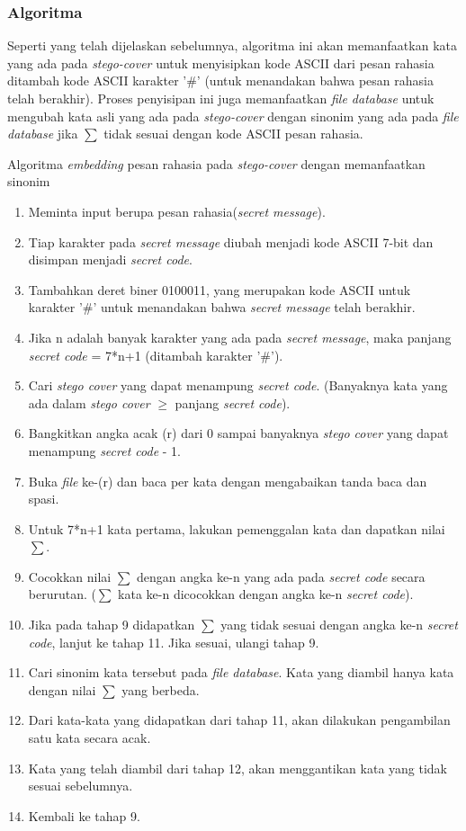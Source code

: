 \subsubsection{Algoritma}
Seperti yang telah dijelaskan sebelumnya, algoritma ini akan memanfaatkan kata yang ada pada \textit{stego-cover} untuk menyisipkan kode ASCII dari pesan rahasia ditambah kode ASCII karakter '\#' (untuk menandakan bahwa pesan rahasia telah berakhir). Proses penyisipan ini juga memanfaatkan \textit{file database} untuk mengubah kata asli yang ada pada \textit{stego-cover} dengan sinonim yang ada pada \textit{file database} jika $\sum$ tidak sesuai dengan kode ASCII pesan rahasia.

Algoritma \textit{embedding} pesan rahasia pada \textit{stego-cover} dengan memanfaatkan sinonim

\begin{enumerate}
	\item Meminta input berupa pesan rahasia(\textit{secret message}).
	\item Tiap karakter pada \textit{secret message} diubah menjadi kode ASCII 7-bit dan disimpan menjadi \textit{secret code}.
	\item Tambahkan deret biner 0100011, yang merupakan kode ASCII untuk karakter '\#' untuk menandakan bahwa \textit{secret message} telah berakhir.
	\item Jika n adalah banyak karakter yang ada pada \textit{secret message}, maka panjang \textit{secret code} = 7*n+1 (ditambah karakter '\#').
	\item Cari \textit{stego cover} yang dapat menampung \textit{secret code}. (Banyaknya kata yang ada dalam \textit{stego cover} $\geq$ panjang \textit{secret code}).
	\item Bangkitkan angka acak (r) dari 0 sampai banyaknya \textit{stego cover} yang dapat menampung \textit{secret code} - 1. 
	\item Buka \textit{file} ke-(r) dan baca per kata dengan mengabaikan tanda baca dan spasi.
	\item Untuk 7*n+1 kata pertama, lakukan pemenggalan kata dan dapatkan nilai $\sum$.
	\item Cocokkan nilai $\sum$ dengan angka ke-n yang ada pada \textit{secret code} secara berurutan. ($\sum$ kata ke-n dicocokkan dengan angka ke-n \textit{secret code}).
	\item Jika pada tahap 9 didapatkan $\sum$ yang tidak sesuai dengan angka ke-n \textit{secret code}, lanjut ke tahap 11. Jika sesuai, ulangi tahap 9.
	\item Cari sinonim kata tersebut pada \textit{file database}. Kata yang diambil hanya kata dengan nilai $\sum$ yang berbeda.
	\item Dari kata-kata yang didapatkan dari tahap 11, akan dilakukan pengambilan satu kata secara acak.
	\item Kata yang telah diambil dari tahap 12, akan menggantikan kata yang tidak sesuai sebelumnya.
	\item Kembali ke tahap 9.
\end{enumerate}

